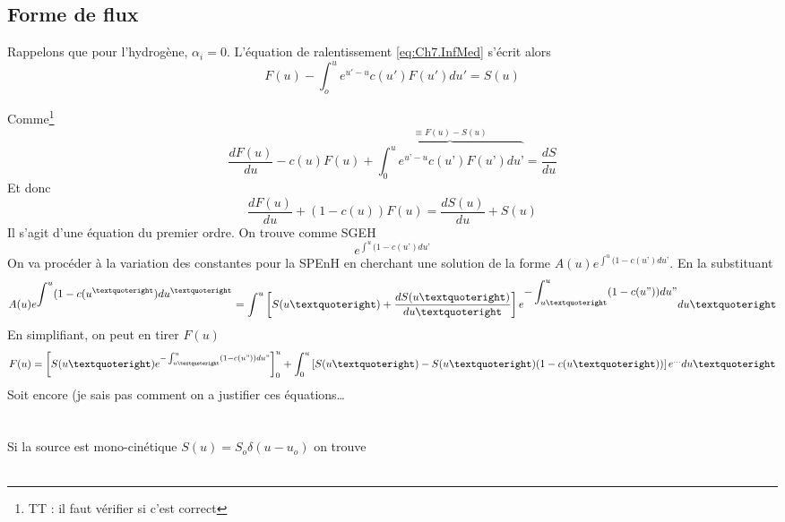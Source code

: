 	
	\subsection{Forme de flux}
	Rappelons que pour l'hydrogène, $\alpha_i=0$. L'équation de ralentissement \eqref{eq:Ch7.InfMed}
	s'écrit alors	
	\begin{equation}
	F(u) - \int_o^u    {e^{u' - u}}c(u')F(u')du' = S(u)
	\end{equation}
	
	Comme\footnote{TT : il faut vérifier si c'est correct}
	\begin{equation}
	\frac{dF(u)}{du} - c(u)F(u) +\overbrace{\int_0^u e^{u’-u} c(u’)F(u’)du’}^{\equiv F(u)-S(u)} =
	\frac{dS}{du}
	\end{equation}
	Et donc
	\begin{equation}
	\frac{{dF(u)}}{{du}} + (1 - c(u))F(u) = \frac{{dS(u)}}{{du}} + S(u)
	\end{equation}		
	Il s'agit d'une équation du premier ordre. On trouve comme SGEH 
	\begin{equation}
	e^{\int^u (1-c(u’)du’}
	\end{equation}
	On va procéder à la variation des constantes pour la SPEnH en cherchant une solution de la 
	forme $A(u) e^{\int^u (1-c(u’)du’}$. En la substituant
	\begin{equation}
	A(u) e^{\DS\int^u (1-c(u^{’})du^{’}}  = \int^u\left[ S(u’)+\dfrac{dS(u’)}{du’}\right]
	e^{\DS-\int_{u’}^u (1-c(u"))du"}du’
	\end{equation}
	En simplifiant, on peut en tirer $F(u)$
	\begin{equation}
	F(u) = \left[ S(u’) e^{-\int_{u’}^u (1-c(u"))du"}\right]_0^u + \int_0^u
	\left[S(u’)-S(u’)(1-c(u’))\right]e^{\dots} du’
	\end{equation}
	Soit encore (je sais pas comment on a justifier ces équations\dots\\ \\
	
	\ \\
	
	Si la source est mono-cinétique $S(u) = {S_o}\delta (u - {u_o})$ on trouve\\
	
	\ \\
	
